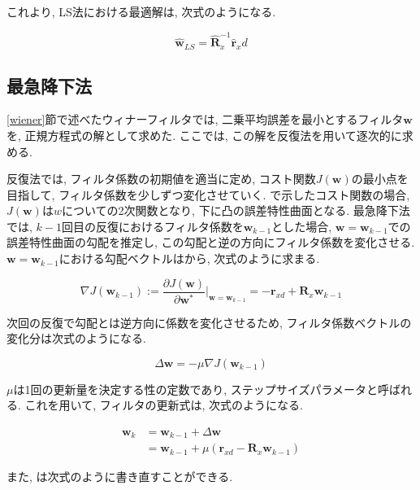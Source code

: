これより, LS法における最適解は, 次式のようになる. 

\begin{equation}
\hat{\bm{w}}_{LS} = \hat{\bm{R}}_x^{-1} \hat{\bm{r}}_xd
\end{equation}

\subsection{最急降下法}\label{sd}

\ref{wiener}節で述べたウィナーフィルタでは, 二乗平均誤差を最小とするフィルタ\(\bm{w}\)を, 正規方程式の解として求めた. ここでは, この解を反復法を用いて逐次的に求める. 

反復法では, フィルタ係数の初期値を適当に定め, コスト関数\(J(\bm{w})\)の最小点を目指して, フィルタ係数を少しずつ変化させていく. で示したコスト関数の場合, \(J(\bm{w})\)は\(w\)についての2次関数となり, 下に凸の誤差特性曲面となる. 最急降下法では, \(k-1\)回目の反復におけるフィルタ係数を\(\bm{w}_{k-1}\)とした場合, \(\bm{w} = \bm{w}_{k-1}\)での誤差特性曲面の勾配を推定し, この勾配と逆の方向にフィルタ係数を変化させる. \(\bm{w} = \bm{w}_{k-1}\)における勾配ベクトルはから, 次式のように求まる. 

\begin{equation}
\nabla J(\bm{w}_{k-1}) := \frac{\partial J(\bm{w})}{\partial \bm{w}^*} |_{\bm{w} = \bm{w}_{k-1}} = - \bm{r}_{xd} + \bm{R}_x \bm{w}_{k-1}
\end{equation}

次回の反復で勾配とは逆方向に係数を変化させるため, フィルタ係数ベクトルの変化分は次式のようになる. 

\begin{equation}
\Delta \bm{w} = - \mu \nabla J(\bm{w}_{k-1})
\end{equation}

\(\mu\)は1回の更新量を決定する性の定数であり, ステップサイズパラメータと呼ばれる. これを用いて, フィルタの更新式は, 次式のようになる. 

\begin{equation}
\begin{split}
\bm{w}_k &= \bm{w}_{k-1} + \Delta \bm{w} \\
         &= \bm{w}_{k-1} + \mu (\bm{r}_{xd} - \bm{R}_x \bm{w}_{k-1})
\end{split}
\label{equ:w_delta}
\end{equation}

また, は次式のように書き直すことができる. 

